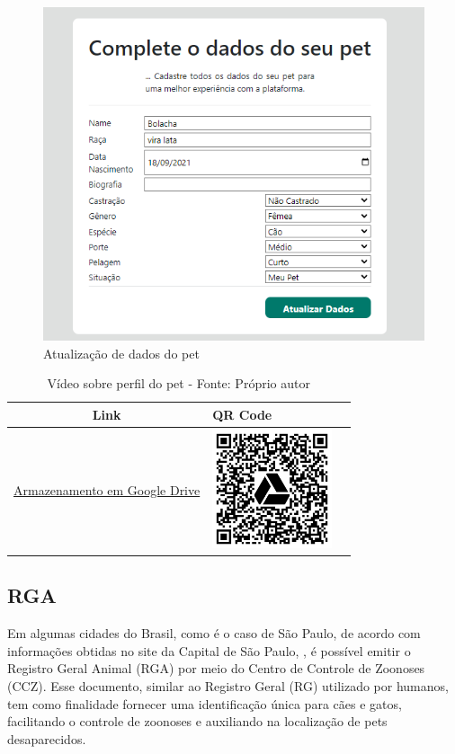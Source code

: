 \begin{figure}[htb]
     \centering
     \includegraphics[width=12cm]{arquivos/Figuras/image9.png}
     \caption{Atualização de dados do pet}
     \label{fig:ConfigurarDadosPerfilPet}
\end{figure}

\begin{table}[htbp]
\centering
\renewcommand{\arraystretch}{1.5}
\begin{tabular}{|c|>{\centering\arraybackslash}m{6cm}|c|}
\hline
\textbf{Link} & \textbf{QR Code} \\
\hline
\href{https://drive.google.com/file/d/1UlXozzkAb4PsnaElhlGWawhkKrsX8MIv/view?usp=drive_link}{Armazenamento em Google Drive} & \includegraphics[width=3.5cm]{arquivos/ImgLinks/perfilPet.png} \\
\hline
\end{tabular}
\caption*{Vídeo sobre perfil do pet - Fonte: Próprio autor}
\end{table}

\newpage
\subsection{RGA}
Em algumas cidades do Brasil, como é o caso de São Paulo, de acordo com informações obtidas no site da Capital de São Paulo, , é possível emitir o Registro Geral Animal (RGA) por meio do Centro de Controle de Zoonoses (\gls{CCZ}). Esse documento, similar ao Registro Geral (\gls{RG}) utilizado por humanos, tem como finalidade fornecer uma identificação única para cães e gatos, facilitando o controle de zoonoses e auxiliando na localização de pets desaparecidos.

